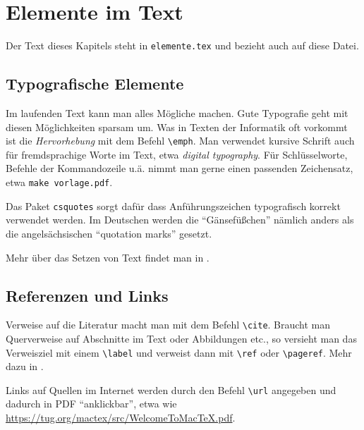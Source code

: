 %

\chapter{Elemente im Text}

Der Text dieses Kapitels steht in \verb=elemente.tex= und bezieht auch
auf diese Datei.

\section{Typografische Elemente}

Im laufenden Text kann man alles Mögliche machen. Gute Typografie geht
mit diesen Möglichkeiten sparsam um. Was in Texten der Informatik oft
vorkommt ist die \emph{Hervorhebung} mit dem Befehl \verb=\emph=. Man
verwendet kursive Schrift auch für fremdsprachige Worte im Text, etwa
\textit{digital typography}.
Für Schlüsselworte, Befehle der Kommandozeile u.ä. nimmt man gerne einen
passenden Zeichensatz, etwa \texttt{make vorlage.pdf}. 

Das Paket \verb=csquotes= sorgt dafür dass Anführungszeichen
typografisch korrekt verwendet werden. Im Deutschen werden die
\enquote{Gänsefüßchen} nämlich anders als die angelsächsischen
\foreignquote{english}{quotation marks} gesetzt.

Mehr über das Setzen von Text findet man in \cite{lkurz15}.

\section{Referenzen und Links}

Verweise auf die Literatur macht man mit dem Befehl \verb=\cite=.
Braucht man Querverweise auf Abschnitte im Text oder Abbildungen etc.,
so versieht man das Verweisziel mit einem \verb=\label= und verweist
dann mit \verb=\ref= oder \verb=\pageref=. Mehr dazu in
\cite[S.50]{partosch15}.

Links auf Quellen im Internet werden durch den Befehl \verb=\url=
angegeben und dadurch in PDF \enquote{anklickbar}, etwa wie
\url{https://tug.org/mactex/src/WelcomeToMacTeX.pdf}.

